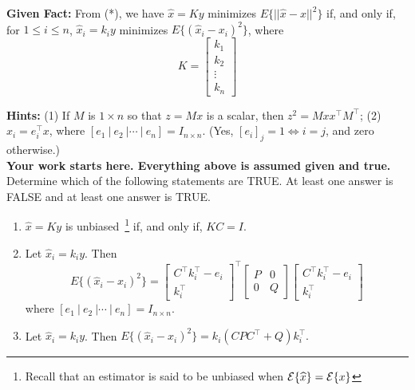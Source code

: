 {\begin{example}
\begin{itemize}
  \end{itemize}

\noindent \textbf{Given Fact:} From (*), we have $\hat{x} = Ky$ minimizes $E\{ ||\hat{x} - x||^2 \} $ if, and only if, for $ 1 \le i \le n$,  $\hat{x}_i = k_i y$ minimizes $ E\{ \left( \hat{x}_i - x_i \right)^2 \}$, where $$K=\left[ \begin{array}{r}  k_1  \\  k_2 \\   \vdots \\ k_n\end{array} \right] $$


\textbf{Hints:} (1)  If $M$ is $1 \times n$ so that $z = Mx$ is a scalar, then $z^2 = M x x^\top M^\top$; (2) $x_i = e_i^\top x$, where $[e_1~|~e_2~| \cdots ~|~e_n] = I_{n \times n}$. (Yes, $[e_i]_j = 1 \iff i = j$, and zero otherwise.)\\




\noindent \textbf{Your work starts here. Everything above is assumed given and true.} Determine which of the following statements are TRUE. At least one answer is FALSE and at least one answer is TRUE.

\begin{enumerate}
\setlength{\itemsep}{.1in}
\renewcommand{\labelenumi}{(\alph{enumi})}
\item $\widehat{x} = K y$ is unbiased~\footnote{Recall that an estimator is said to be unbiased when ${\cal E} \{\widehat{x} \} = {\cal E} \{ x \}$} if, and only if, $KC=I$.

\item  Let $\widehat{x}_i = k_i y$. Then
$$E\{ \left( \widehat{x}_i - x_i \right)^2 \} =   \left[ \begin{array}{c} C^\top k_i^\top - e_i \\ k_i^\top\end{array} \right]^\top \left[ \begin{array}{cc}  P & 0  \\ 0& Q \end{array} \right] \left[ \begin{array}{c} C^\top k_i^\top - e_i \\ k_i^\top\end{array} \right]$$
where  $[e_1~|~e_2~| \cdots ~|~e_n] = I_{n \times n}$.

\item  Let $\widehat{x}_i = k_i y$. Then
$E\{ \left( \widehat{x}_i - x_i \right)^2 \} =  k_i (C P C^\top + Q) k_i^\top. $


\end{enumerate}
\end{example}}
